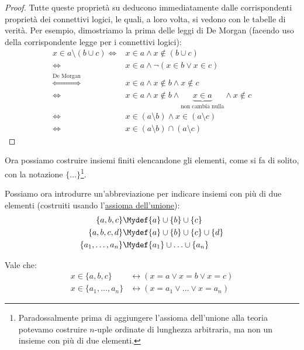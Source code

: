 \documentclass[11pt]{scrartcl}
\begin{document}
\begin{proof}
	Tutte queste proprietà su deducono immediatamente dalle corrispondenti proprietà dei connettivi logici, le quali, a loro volta, si vedono con le tabelle di verità. Per esempio, dimostriamo 
	la prima delle leggi di De Morgan (facendo uso della corrispondente legge per i connettivi logici):
	\[ \begin{split}
		x \in a \setminus (b \cup c) \iff & x \in a \land x \not\in (b \cup c)\\
		\iff & x \in a \land \neg(x \in b \lor x \in c)\\
		\overset{\text{De Morgan}}{\iff} & x \in a \land x \not\in b \land x \not\in c\\
		\iff & x \in a \land x \not\in b \land \underbrace{x \in a}_{\text {non cambia nulla}} \land x \not\in c\\
		\iff & x \in (a \setminus b) \land x \in (a \setminus c)\\
		\iff & x \in (a \setminus b) \cap (a \setminus c)
	\end{split}
		\]
\end{proof}

Ora possiamo costruire insiemi finiti elencandone gli elementi, come si fa di solito, con la notazione $\{\ldots\}$\footnote{Paradossalmente prima di aggiungere l'assioma dell'unione
alla teoria potevamo costruire $n$-uple ordinate di lunghezza arbitraria, ma non un insieme con più di due elementi.}.

\begin{notation}
	Possiamo ora introdurre un'abbreviazione per indicare insiemi con più di due elementi (costruiti usando l'\hyperref[ax5]{assioma dell'unione}):
	\[ \begin{split}
	   \{a,b,c\} &\Mydef \{a\} \cup \{b\} \cup \{c\} \\
	   \{a,b,c,d\} &\Mydef \{a\} \cup \{b\} \cup \{c\} \cup \{d\} \\
	   \{a_1,\ldots,a_n\} &\Mydef \{a_1\} \cup \ldots \cup \{a_n\}
	\end{split}
	\]
\end{notation}

\begin{proposition}
	Vale che:
	\[  \begin{split}
		x \in \{a,b,c\} & \leftrightarrow (x = a \lor x = b \lor x = c) \\
	    x \in \{a_1,\ldots,a_n\} & \leftrightarrow (x = a_1 \lor \ldots \lor x = a_n) 
		\end{split}
			\]
\end{proposition}
\end{document}
